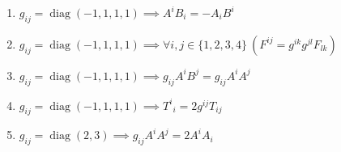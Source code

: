 \documentclass[11pt,a4paper]{article}
\begin{document}
\begin{enumerate}
\item $\displaystyle g_{ij} = \operatorname{diag}(-1, 1, 1, 1) \implies A^{i} B_{i} = -A_{i} B^{i}$
\item $\displaystyle g_{ij} = \operatorname{diag}(-1, 1, 1, 1) \implies \forall i, j \in \{1, 2, 3, 4\}\ \left( F^{ij} = g^{ik} g^{jl} F_{lk} \right)$
\item $\displaystyle g_{ij} = \operatorname{diag}(-1, 1, 1, 1) \implies g_{ij} A^{i} B^{j} = g_{ij} A^{i} A^{j}$
\item $\displaystyle g_{ij} = \operatorname{diag}(-1, 1, 1, 1) \implies T^{i}{}_{i} = 2 g^{ij} T_{ij}$
\item $\displaystyle g_{ij} = \operatorname{diag}(2, 3) \implies g_{ij} A^{i} A^{j} = 2 A^{i} A_{i}$
\end{enumerate}
\end{document}
